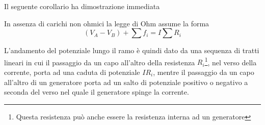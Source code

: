 Il seguente corollario ha dimostrazione immediata
\begin{cor}
In assenza di carichi non ohmici la legge di Ohm assume la forma
    \[
        (V_A-V_B)+\sum f_i=I\sum R_i
    \]
\end{cor}
L'andamento del potenziale lungo il ramo è quindi dato da una sequenza di tratti lineari in cui il passaggio da un capo all'altro
della resistenza $R_i$\footnote{Questa resistenza può anche essere la resistenza interna ad un generatore},
nel verso della corrente, porta ad una caduta di potenziale $IR_i$, mentre il passaggio da un capo all'altro di un generatore
porta ad un salto di potenziale positivo o negativo a seconda del verso nel quale il generatore spinge la corrente.

